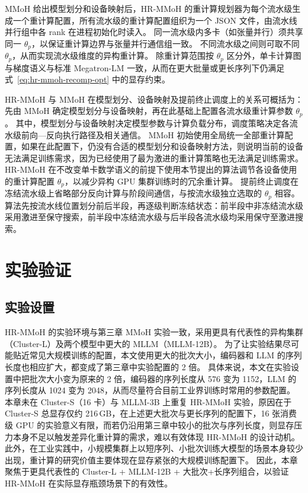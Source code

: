 MMoH 给出模型划分和设备映射后，HR-MMoH 的重计算规划器为每个流水级生成一个重计算配置，所有流水级的重计算配置组织为一个 JSON 文件，由流水线并行组中各 rank 在进程初始化时读入。
同一流水级内多卡（如张量并行）须共享同一 $\theta_p$，以保证重计算边界与张量并行通信组一致。
不同流水级之间则可取不同 $\theta_p$，从而实现流水级维度的异构重计算。
除重计算范围按 $\theta_p$ 区分外，单卡计算图与梯度语义与标准 Megatron-LM 一致，从而在更大批量或更长序列下仍满足式~\eqref{eq:hr-mmoh-recomp-opt} 中的显存约束。


HR-MMoH 与 MMoH 在模型划分、设备映射及提前终止调度上的关系可概括为：先由 MMoH 确定模型划分与设备映射，再在此基础上配置各流水级重计算参数 $\theta_p$。
其中，模型划分与设备映射决定模型参数与计算负载分布，调度策略决定各流水级前向—反向执行路径及相关通信。
MMoH 初始使用全局统一全部重计算配置，如果在此配置下，仍没有合适的模型划分和设备映射方法，则说明当前的设备无法满足训练需求，因为已经使用了最为激进的重计算策略也无法满足训练需求。
HR-MMoH 在不改变单卡数学语义的前提下使用本节提出的算法调节各设备使用的重计算配置 $\theta_p$，以减少异构 GPU 集群训练时的冗余重计算。
提前终止调度在冻结流水级上省略部分反向计算与阶段间通信，与按流水级独立选取的 $\theta_p$ 相容。算法先按流水线位置划分前后半段，再逐级判断冻结状态：前半段中非冻结流水级采用激进至保守搜索，前半段中冻结流水级与后半段各流水级均采用保守至激进搜索。

\section{实验验证}
\label{sec:HR-MMoH-exp}

\subsection{实验设置}

HR-MMoH 的实验环境与第三章 MMoH 实验一致，采用更具有代表性的异构集群（Cluster-L）及两个模型中更大的 MLLM（MLLM-12B）。
为了让实验结果尽可能贴近常见大规模训练的配置，本文使用更大的批次大小，编码器和 LLM 的序列长度也相应扩大，都变成了第三章中实验配置的 2 倍。
具体来说，本文在实验设置中把批次大小变为原来的 2 倍，编码器的序列长度从 576 变为 1152，LLM 的序列长度从 1024 变为 2048，从而尽量符合目前工业界训练时常用的参数配置。
本章未在 Cluster-S（16 卡）与 MLLM-3B 上重复 HR-MMoH 实验，原因在于 Cluster-S 总显存仅约 216\,GB，在上述更大批次与更长序列的配置下，16 张消费级 GPU 的实验意义有限，而若仍沿用第三章中较小的批次与序列长度，则显存压力本身不足以触发差异化重计算的需求，难以有效体现 HR-MMoH 的设计动机。
此外，在工业实践中，小规模集群上以短序列、小批次训练大模型的场景本身较少出现，重计算的研究价值主要体现在显存紧张的大规模训练配置下。
因此，本章聚焦于更具代表性的 Cluster-L + MLLM-12B + 大批次+长序列组合，以验证 HR-MMoH 在实际显存瓶颈场景下的有效性。

